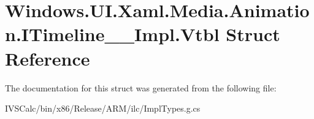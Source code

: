 \hypertarget{struct_windows_1_1_u_i_1_1_xaml_1_1_media_1_1_animation_1_1_i_timeline_____impl_1_1_vtbl}{}\section{Windows.\+U\+I.\+Xaml.\+Media.\+Animation.\+I\+Timeline\+\_\+\+\_\+\+Impl.\+Vtbl Struct Reference}
\label{struct_windows_1_1_u_i_1_1_xaml_1_1_media_1_1_animation_1_1_i_timeline_____impl_1_1_vtbl}


The documentation for this struct was generated from the following file\+:\begin{DoxyCompactItemize}
\item 
I\+V\+S\+Calc/bin/x86/\+Release/\+A\+R\+M/ilc/Impl\+Types.\+g.\+cs\end{DoxyCompactItemize}

